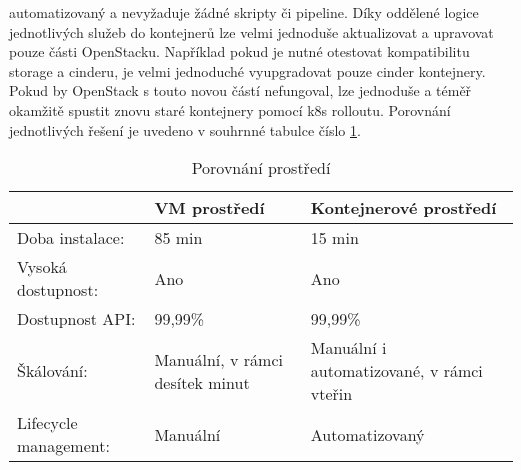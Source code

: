 automatizovaný a nevyžaduje žádné skripty či pipeline. Díky oddělené logice jednotlivých služeb do kontejnerů lze velmi jednoduše aktualizovat a upravovat pouze části OpenStacku. Například pokud je nutné otestovat kompatibilitu storage a cinderu, je velmi jednoduché vyupgradovat pouze cinder kontejnery. Pokud by OpenStack s touto novou částí nefungoval, lze jednoduše a téměř okamžitě spustit znovu staré kontejnery pomocí k8s rolloutu. Porovnání jednotlivých řešení je uvedeno v souhrnné tabulce číslo \ref{tbl:vm_k8s}.

\begin{table}[H]
\begin{center}
\caption{Porovnání prostředí}
\label{tbl:vm_k8s}
\begin{tabular}{|p{40mm}|p{50mm}|p{50mm}|}
\hline
~ & VM prostředí & Kontejnerové prostředí \\ \hline
Doba instalace: & 85 min & 15 min \\ \hline
Vysoká dostupnost: & Ano & Ano \\ \hline
Dostupnost API: & 99,99\% & 99,99\% \\ \hline
Škálování: & Manuální, v rámci desítek minut & Manuální i automatizované, v rámci vteřin \\ \hline
Lifecycle management: & Manuální & Automatizovaný \\ \hline
\end{tabular}
\end{center}
\end{table}


